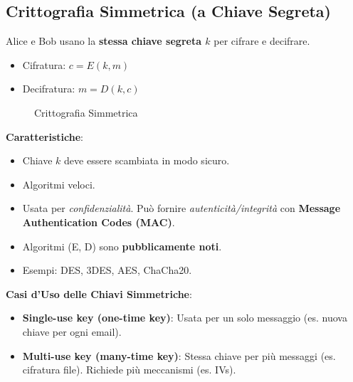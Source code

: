 \documentclass{article}
\begin{document}
\subsection{Crittografia Simmetrica (a Chiave Segreta)}
Alice e Bob usano la \textbf{stessa chiave segreta $k$} per cifrare e decifrare.
\begin{itemize}
    \item Cifratura: $c = E(k, m)$
    \item Decifratura: $m = D(k, c)$
\end{itemize}
\begin{figure}[H]
\centering
{}
\caption{Crittografia Simmetrica}
\label{fig:symmetric_crypto}
\end{figure}
\textbf{Caratteristiche}:
\begin{itemize}
    \item Chiave $k$ deve essere scambiata in modo sicuro.
    \item Algoritmi veloci.
    \item Usata per \textit{confidenzialità}. Può fornire \textit{autenticità/integrità} con \textbf{Message Authentication Codes (MAC)}.
    \item Algoritmi (E, D) sono \textbf{pubblicamente noti}.
    \item Esempi: DES, 3DES, AES, ChaCha20.
\end{itemize}
\textbf{Casi d'Uso delle Chiavi Simmetriche}:
\begin{itemize}
    \item \textbf{Single-use key (one-time key)}: Usata per un solo messaggio (es. nuova chiave per ogni email).
    \item \textbf{Multi-use key (many-time key)}: Stessa chiave per più messaggi (es. cifratura file). Richiede più meccanismi (es. IVs).
\end{itemize}
\end{document}
